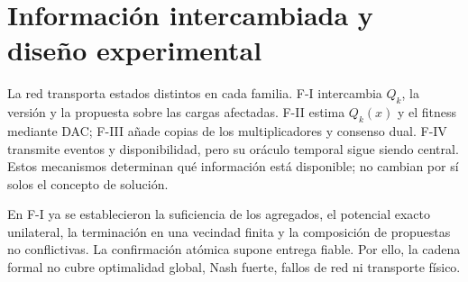 \clearpage

\section*{Información intercambiada y diseño experimental}
\enlargethispage{2\baselineskip}

La red transporta estados distintos en cada familia. F-I intercambia $Q_k$, la
versión y la propuesta sobre las cargas afectadas. F-II estima $Q_k(x)$ y el
fitness mediante DAC; F-III añade copias de los multiplicadores y consenso
dual. F-IV transmite eventos y disponibilidad, pero su oráculo temporal sigue
siendo central. Estos mecanismos determinan qué información está disponible;
no cambian por sí solos el concepto de solución.

En F-I ya se establecieron la suficiencia de los agregados, el potencial exacto
unilateral, la terminación en una vecindad finita y la composición de propuestas
no conflictivas. La confirmación atómica supone entrega fiable. Por ello,
la cadena formal no cubre optimalidad global, Nash fuerte, fallos de red ni
transporte físico.

